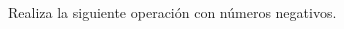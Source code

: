 \documentclass[12pt,addpoints]{evalua}
\begin{document}
\begin{questions}
      \question[20] Realiza la siguiente operación con números negativos.
      \begin{multicols}{2}
\end{multicols}
\end{questions}
\end{document}
